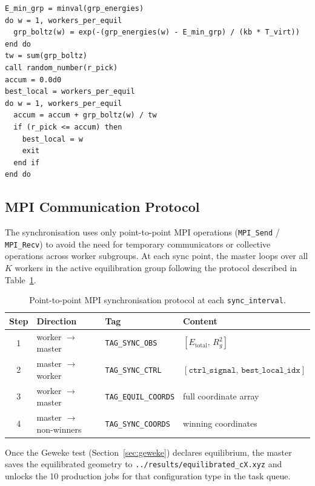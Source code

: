 \documentclass[11pt, a4paper]{article}
\begin{document}
\begin{lstlisting}[caption={Boltzmann roulette wheel selection.}]
E_min_grp = minval(grp_energies)
do w = 1, workers_per_equil
  grp_boltz(w) = exp(-(grp_energies(w) - E_min_grp) / (kb * T_virt))
end do
tw = sum(grp_boltz)
call random_number(r_pick)
accum = 0.0d0
best_local = workers_per_equil
do w = 1, workers_per_equil
  accum = accum + grp_boltz(w) / tw
  if (r_pick <= accum) then
    best_local = w
    exit
  end if
end do
\end{lstlisting}

\subsection{MPI Communication Protocol}

The synchronisation uses only point-to-point MPI operations (\texttt{MPI\_Send}
/ \texttt{MPI\_Recv}) to avoid the need for temporary communicators or collective
operations across worker subgroups. At each sync point, the master loops over
all $K$ workers in the active equilibration group following the protocol
described in Table~\ref{tab:mpi_protocol}.

\begin{table}[ht]
\centering
\caption{Point-to-point MPI synchronisation protocol at each \texttt{sync\_interval}.}
\label{tab:mpi_protocol}
\begin{tabular}{clll}
\toprule
Step & Direction & Tag & Content \\
\midrule
1 & worker $\to$ master & \texttt{TAG\_SYNC\_OBS}    & $[E_{\text{total}},\, R_g^2]$ \\
2 & master $\to$ worker & \texttt{TAG\_SYNC\_CTRL}   & $[\texttt{ctrl\_signal},\, \texttt{best\_local\_idx}]$ \\
3 & worker $\to$ master & \texttt{TAG\_EQUIL\_COORDS}& full coordinate array \\
4 & master $\to$ non-winners & \texttt{TAG\_SYNC\_COORDS} & winning coordinates \\
\bottomrule
\end{tabular}
\end{table}

Once the Geweke test (Section~\ref{sec:geweke}) declares equilibrium, the master
saves the equilibrated geometry to \texttt{../results/equilibrated\_cX.xyz} and
unlocks the 10 production jobs for that configuration type in the task queue.


\end{document}
